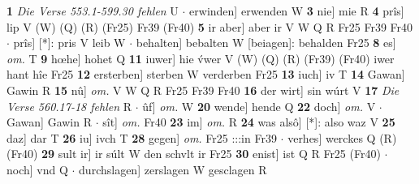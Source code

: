 \documentclass[8pt,a4paper,notitlepage]{article}
\begin{document}
\begin{table}[ht]
\begin{minipage}[t]{0.5\linewidth}
\textbf{1} \textit{Die Verse 553.1-599.30 fehlen} U   $\cdot$ erwinden] erwenden W \textbf{3} nie] mie R \textbf{4} prîs] lip V (W) (Q) (R) (Fr25) Fr39 (Fr40) \textbf{5} ir aber] aber ir V W Q R Fr25 Fr39 Fr40  $\cdot$ prîs] [*]: pris V leib W  $\cdot$ behalten] bebalten W [beiagen]: behalden Fr25 \textbf{8} es] \textit{om.} T \textbf{9} hœhe] hohet Q \textbf{11} iuwer] hie v́wer V (W) (Q) (R) (Fr39) (Fr40) iwer hant hîe Fr25 \textbf{12} ersterben] sterben W verderben Fr25 \textbf{13} iuch] iv T \textbf{14} Gawan] Gawin R \textbf{15} nû] \textit{om.} V W Q R Fr25 Fr39 Fr40 \textbf{16} der wirt] sin wúrt V \textbf{17} \textit{Die Verse 560.17-18 fehlen} R   $\cdot$ ûf] \textit{om.} W \textbf{20} wende] hende Q \textbf{22} doch] \textit{om.} V  $\cdot$ Gawan] Gawin R  $\cdot$ sît] \textit{om.} Fr40 \textbf{23} im] \textit{om.} R \textbf{24} was alsô] [*]: also waz V \textbf{25} daz] dar T \textbf{26} iu] ivch T \textbf{28} gegen] \textit{om.} Fr25 :::in Fr39  $\cdot$ verhes] werckes Q (R) (Fr40) \textbf{29} sult ir] ir súlt W den schvlt ir Fr25 \textbf{30} enist] ist Q R Fr25 (Fr40)  $\cdot$ noch] vnd Q  $\cdot$ durchslagen] zerslagen W gesclagen R \newline
\end{minipage}
\end{table}
\end{document}
